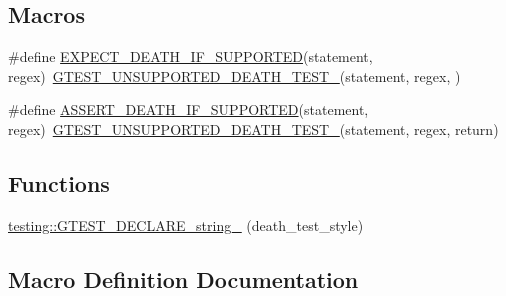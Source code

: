 \subsection*{Macros}
\begin{DoxyCompactItemize}
\item 
\#define \hyperlink{gtest-death-test_8h_a8564de0e012dd0898949c513d1571f8b}{E\+X\+P\+E\+C\+T\+\_\+\+D\+E\+A\+T\+H\+\_\+\+I\+F\+\_\+\+S\+U\+P\+P\+O\+R\+T\+ED}(statement,  regex)~\hyperlink{gtest-death-test-internal_8h_a29a145cda8bd2d0c6a78b0ac1d670d18}{G\+T\+E\+S\+T\+\_\+\+U\+N\+S\+U\+P\+P\+O\+R\+T\+E\+D\+\_\+\+D\+E\+A\+T\+H\+\_\+\+T\+E\+S\+T\+\_\+}(statement, regex, )
\item 
\#define \hyperlink{gtest-death-test_8h_ab2f0f25b46353767179a49ebd15b7345}{A\+S\+S\+E\+R\+T\+\_\+\+D\+E\+A\+T\+H\+\_\+\+I\+F\+\_\+\+S\+U\+P\+P\+O\+R\+T\+ED}(statement,  regex)~\hyperlink{gtest-death-test-internal_8h_a29a145cda8bd2d0c6a78b0ac1d670d18}{G\+T\+E\+S\+T\+\_\+\+U\+N\+S\+U\+P\+P\+O\+R\+T\+E\+D\+\_\+\+D\+E\+A\+T\+H\+\_\+\+T\+E\+S\+T\+\_\+}(statement, regex, return)
\end{DoxyCompactItemize}
\subsection*{Functions}
\begin{DoxyCompactItemize}
\item 
\hyperlink{namespacetesting_a37b7e87f0a5f502c6918f37d1768c1f3}{testing\+::\+G\+T\+E\+S\+T\+\_\+\+D\+E\+C\+L\+A\+R\+E\+\_\+string\+\_\+} (death\+\_\+test\+\_\+style)
\end{DoxyCompactItemize}


\subsection{Macro Definition Documentation}
\mbox{\label{gtest-death-test_8h_ab2f0f25b46353767179a49ebd15b7345}} 
